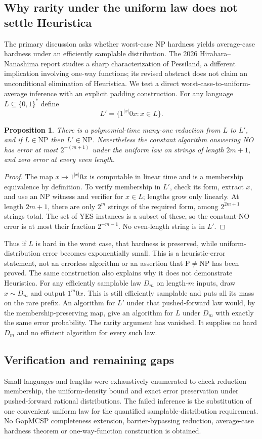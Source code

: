 \documentclass[11pt]{article}
\newtheorem{proposition}{Proposition}
\begin{document}
\subsection{Why rarity under the uniform law does not settle Heuristica}
The primary discussion asks whether worst-case NP hardness yields average-case hardness under an efficiently samplable distribution. The 2026 Hirahara--Nanashima report studies a sharp characterization of Pessiland, a different implication involving one-way functions; its revised abstract does not claim an unconditional elimination of Heuristica. We test a direct worst-case-to-uniform-average inference with an explicit padding construction.
For any language $L\subseteq\{0,1\}^*$ define
\[
L'=\{1^{|x|}0x:x\in L\}.
\]
\begin{proposition}
There is a polynomial-time many-one reduction from $L$ to $L'$, and if $L\in\mathrm{NP}$ then $L'\in\mathrm{NP}$. Nevertheless the constant algorithm answering NO has error at most $2^{-(m+1)}$ under the uniform law on strings of length $2m+1$, and zero error at every even length.
\end{proposition}
\begin{proof}
The map $x\mapsto1^{|x|}0x$ is computable in linear time and is a membership equivalence by definition. To verify membership in $L'$, check its form, extract $x$, and use an NP witness and verifier for $x\in L$; lengths grow only linearly. At length $2m+1$, there are only $2^m$ strings of the required form, among $2^{2m+1}$ strings total. The set of YES instances is a subset of these, so the constant-NO error is at most their fraction $2^{-m-1}$. No even-length string is in $L'$.
\end{proof}
Thus if $L$ is hard in the worst case, that hardness is preserved, while uniform-distribution error becomes exponentially small. This is a heuristic-error statement, not an errorless algorithm or an assertion that $\mathrm P\ne\mathrm{NP}$ has been proved.
The same construction also explains why it does not demonstrate Heuristica. For any efficiently samplable law $D_m$ on length-$m$ inputs, draw $x\sim D_m$ and output $1^m0x$. This is still efficiently samplable and puts all its mass on the rare prefix. An algorithm for $L'$ under that pushed-forward law would, by the membership-preserving map, give an algorithm for $L$ under $D_m$ with exactly the same error probability. The rarity argument has vanished. It supplies no hard $D_m$ and no efficient algorithm for every such law.
\subsection{Verification and remaining gaps}
Small languages and lengths were exhaustively enumerated to check reduction membership, the uniform-density bound and exact error preservation under pushed-forward rational distributions. The failed inference is the substitution of one convenient uniform law for the quantified samplable-distribution requirement. No GapMCSP completeness extension, barrier-bypassing reduction, average-case hardness theorem or one-way-function construction is obtained.
\end{document}
